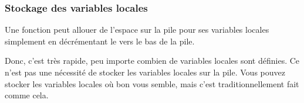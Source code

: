 ﻿\subsubsection{Stockage des variables locales}

Une fonction peut allouer de l'espace sur la pile pour ses variables locales
simplement en décrémentant le  vers le
bas de la pile.


Donc, c'est très rapide, peu importe combien de variables locales sont définies.
Ce n'est pas une nécessité de stocker les variables locales sur la pile.
Vous pouvez stocker les variables locales où bon vous semble,
mais c'est traditionnellement fait comme cela.
